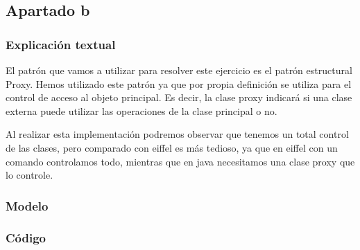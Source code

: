 \documentclass[11pt,a4paper]{article}
\begin{document}
\subsection{Apartado b}

\subsubsection{Explicación textual}

El patrón que vamos a utilizar para resolver este ejercicio es el patrón estructural Proxy. Hemos utilizado este patrón ya que por propia definición se utiliza para el control de acceso al objeto principal. Es decir, la clase proxy indicará si una clase externa puede utilizar las operaciones de la clase principal o no. 
	
Al realizar esta implementación podremos observar que tenemos un total control de las clases, pero comparado con eiffel es más tedioso, ya que en eiffel con un comando controlamos todo, mientras que en java necesitamos una clase proxy que lo controle.

\subsubsection{Modelo}


\begin{figure}[H]
\end{figure}



\subsubsection{Código}
\end{document}
